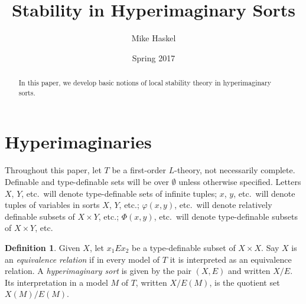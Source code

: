 \documentclass{article}
\title{Stability in Hyperimaginary Sorts}
\author{Mike Haskel}
\date{Spring 2017}
\theoremstyle{definition}
\newtheorem{definition}[theorem]{Definition}
\newcommand{\defterm}{\emph}
\begin{document}
\maketitle

\begin{abstract}
  In this paper, we develop basic notions of local stability theory in hyperimaginary sorts.
\end{abstract}

\section{Hyperimaginaries}

Throughout this paper, let $T$ be a first-order $L$-theory, not necessarily complete. Definable and type-definable sets will be over $\emptyset$ unless otherwise specified. Letters $X$, $Y$, etc.\ will denote type-definable sets of infinite tuples; $x$, $y$, etc.\ will denote tuples of variables in sorts $X$, $Y$, etc.; $\varphi(x,y)$, etc.\ will denote relatively definable subsets of $X \times Y$, etc.; $\Phi(x,y)$, etc.\ will denote type-definable subsets of $X \times Y$, etc.

\begin{definition}
  Given $X$, let $x_1 E x_2$ be a type-definable subset of $X \times X$. Say $X$ is an \defterm{equivalence relation} if in every model of $T$ it is interpreted as an equivalence relation. A \defterm{hyperimaginary sort} is given by the pair $(X,E)$ and written $X/E$. Its interpretation in a model $M$ of $T$, written $X/E(M)$, is the quotient set $X(M)/E(M)$.
\end{definition}
\end{document}
